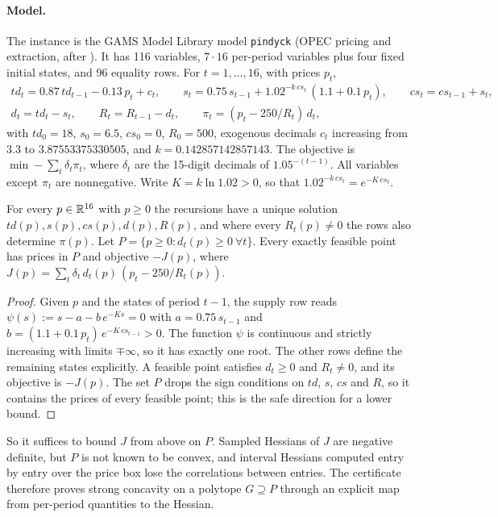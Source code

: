 \paragraph{Model.}
The instance is the GAMS Model Library model \texttt{pindyck} (OPEC pricing and extraction, after \citealp{pindyck1978-gains-to-producers-from-the}).
It has 116 variables, $7\cdot16$ per-period variables plus four fixed initial states, and 96 equality rows.
For $t=1,\dots,16$, with prices $p_t$,
\begin{gather*}
td_t=0.87\,td_{t-1}-0.13\,p_t+c_t,\qquad s_t=0.75\,s_{t-1}+1.02^{-k\,cs_t}\,(1.1+0.1\,p_t),\qquad cs_t=cs_{t-1}+s_t,\\
d_t=td_t-s_t,\qquad R_t=R_{t-1}-d_t,\qquad \pi_t=(p_t-250/R_t)\,d_t,
\end{gather*}
with $td_0=18$, $s_0=6.5$, $cs_0=0$, $R_0=500$, exogenous decimals $c_t$ increasing from $3.3$ to $3.87553375330505$, and $k=0.142857142857143$.
The objective is $\min-\sum_t\delta_t\pi_t$, where $\delta_t$ are the 15-digit decimals of $1.05^{-(t-1)}$.
All variables except $\pi_t$ are nonnegative.
Write $K=k\ln1.02>0$, so that $1.02^{-k\,cs_t}=e^{-K\,cs_t}$.

\begin{lemma}\label{lem:pindyck-reduction}
For every $p\in\mathbb{R}^{16}$ with $p\ge0$ the recursions have a unique solution $td(p),s(p),cs(p),d(p),R(p)$, and where every $R_t(p)\ne0$ the rows also determine $\pi(p)$.
Let $P=\{p\ge0:d_t(p)\ge0\ \forall t\}$.
Every exactly feasible point has prices in $P$ and objective $-J(p)$, where $J(p)=\sum_t\delta_t\,d_t(p)\,(p_t-250/R_t(p))$.
\end{lemma}

\begin{proof}
Given $p$ and the states of period $t-1$, the supply row reads $\psi(s):=s-a-b\,e^{-Ks}=0$ with $a=0.75\,s_{t-1}$ and $b=(1.1+0.1\,p_t)\,e^{-K\,cs_{t-1}}>0$.
The function $\psi$ is continuous and strictly increasing with limits $\mp\infty$, so it has exactly one root.
The other rows define the remaining states explicitly.
A feasible point satisfies $d_t\ge0$ and $R_t\neq0$, and its objective is $-J(p)$.
The set $P$ drops the sign conditions on $td$, $s$, $cs$ and $R$, so it contains the prices of every feasible point; this is the safe direction for a lower bound.
\end{proof}

So it suffices to bound $J$ from above on $P$.
Sampled Hessians of $J$ are negative definite, but $P$ is not known to be convex, and interval Hessians computed entry by entry over the price box lose the correlations between entries.
The certificate therefore proves strong concavity on a polytope $G\supseteq P$ through an explicit map from per-period quantities to the Hessian.

